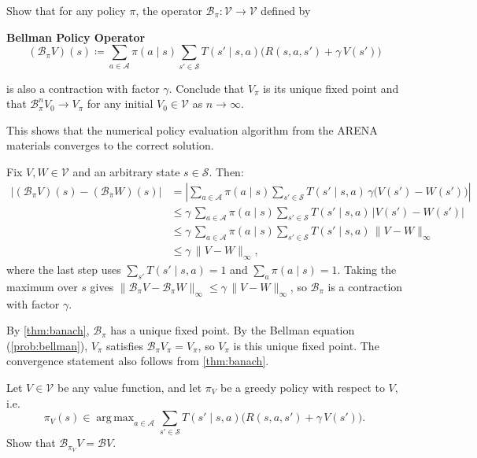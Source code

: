 \documentclass[11pt]{article}
\newcommand{\cS}{\mathcal{S}}
\newcommand{\cA}{\mathcal{A}}
\DeclareMathOperator*{\argmax}{arg\,max}
\begin{document}
\begin{exercise}
\label{prob:Bpi_contraction} Show that for any policy $\pi$, the operator $\mathcal{B}_\pi : \mathcal{V} \to \mathcal{V}$ defined by
\begin{callout}[note]
\textbf{Bellman Policy Operator}
$$
(\mathcal{B}_\pi V)(s) \coloneqq \sum_{a \in \cA} \pi(a \mid s) \sum_{s' \in \cS} T(s' \mid s, a)\bigl(R(s,a,s') + \gamma\, V(s')\bigr)
$$
\end{callout}
is also a contraction with factor $\gamma$. Conclude that $V_\pi$ is its unique fixed point and that $\mathcal{B}^n_{\pi} V_0 \to V_{\pi}$ for any initial $V_0 \in \mathcal{V}$ as $n \to \infty$.

\begin{remark}
This shows that the numerical policy evaluation algorithm from the ARENA materials converges to the correct solution.
\end{remark}
\end{exercise}

\begin{solution}
Fix $V, W \in \mathcal{V}$ and an arbitrary state $s \in \cS$. Then:
\begin{align*}
\big|(\mathcal{B}_\pi V)(s) - (\mathcal{B}_\pi W)(s)\big| &= \left|\sum_{a \in \cA} \pi(a \mid s) \sum_{s' \in \cS} T(s' \mid s, a)\,\gamma\bigl(V(s') - W(s')\bigr)\right| \\
&\le \gamma \,\sum_{a \in \cA} \pi(a \mid s) \sum_{s' \in \cS} T(s' \mid s, a)\,\big|V(s') - W(s')\big| \\
&\le \gamma \, \sum_{a \in \cA} \pi(a \mid s) \sum_{s' \in \cS} T(s' \mid s, a)\,\|V - W\|_\infty\\
&\le \gamma\,\|V - W\|_\infty,
\end{align*}
where the last step uses $\sum_{s'} T(s' \mid s, a) = 1$ and $\sum_a \pi(a \mid s) = 1$. Taking the maximum over $s$ gives $\|\mathcal{B}_\pi V - \mathcal{B}_\pi W\|_\infty \le \gamma\,\|V - W\|_\infty$, so $\mathcal{B}_\pi$ is a contraction with factor $\gamma$.

By \cref{thm:banach}, $\mathcal{B}_\pi$ has a unique fixed point. By the Bellman equation (\cref{prob:bellman}), $V_\pi$ satisfies $\mathcal{B}_\pi V_\pi = V_\pi$, so $V_\pi$ is this unique fixed point.
The convergence statement also follows from \cref{thm:banach}.
\end{solution}


\begin{exercise}
\label{prob:greedy_equals_B} Let $V \in \mathcal{V}$ be any value function, and let $\pi_V$ be a greedy policy with respect to $V$, i.e.\
$$
\pi_V(s) \in \argmax_{a \in \cA} \sum_{s' \in \cS} T(s' \mid s, a)\bigl(R(s,a,s') + \gamma\, V(s')\bigr).
$$
Show that $\mathcal{B}_{\pi_V} V = \mathcal{B} V$.
\end{exercise}
\end{document}
